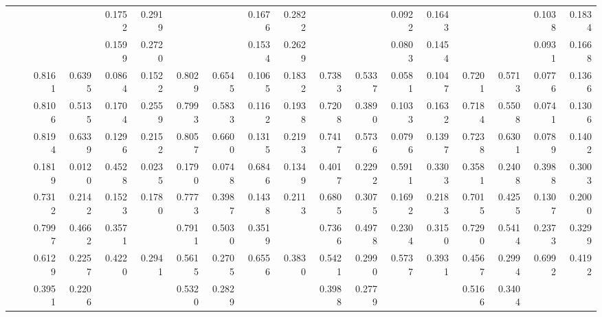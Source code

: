 {\begin{table*}[t]
{\begin{tabular}{|l|l|r|r|r|r|r|r|r|r|r|r|r|r|r|r|r|r|}
				\multirow{11}{*}{\rotatebox{90}{\DBLP}} 
				&\ATC       & \cellcolor{LightRed}{0.8376} & \cellcolor{LightCyan}{0.8749} & 0.1752 & 0.2919 & \cellcolor{LightRed}{0.8230} & \cellcolor{LightCyan}{0.8916} & 0.1676 & 0.2822 & \cellcolor{LightRed}{0.7527} & \cellcolor{LightCyan}{0.7539} & 0.0922 & 0.1643 & \cellcolor{LightRed}{0.7360} & \cellcolor{LightCyan}{0.7849} & 0.1038 & 0.1834 \\
				&\CTC       & \cellcolor{LightCyan}{0.8365} & \cellcolor{LightRed}{0.9107} & 0.1599 & 0.2720 & \cellcolor{LightCyan}{0.8216} & \cellcolor{LightRed}{0.9214} & 0.1534 & 0.2629 & \cellcolor{LightCyan}{0.7512} & \cellcolor{LightRed}{0.7711} & 0.0803 & 0.1454 & \cellcolor{LightCyan}{0.7345} & \cellcolor{LightRed}{0.8012} & 0.0931 & 0.1668 \\\cline{2-18}
				&\MAML      & 0.8161 & 0.6395 & 0.0864 & 0.1522 & 0.8029 & 0.6545 & 0.1065 & 0.1832 & 0.7383 & 0.5337 & 0.0581 & 0.1047 & 0.7201 & 0.5713 & 0.0776 & 0.1366 \\
				&\Reptile   & 0.8106 & 0.5135 & 0.1704 & 0.2559 & 0.7993 & 0.5833 & 0.1162 & 0.1938 & 0.7208 & 0.3890 & 0.1033 & 0.1632 & 0.7184 & 0.5508 & 0.0741 & 0.1306 \\
				&\Featrans  & 0.8194 & 0.6339 & 0.1296 & 0.2152 & 0.8057 & 0.6600 & 0.1315 & 0.2193 & 0.7417 & 0.5736 & 0.0796 & 0.1397 & 0.7238 & 0.6301 & 0.0789 & 0.1402 \\
				&\PN        & 0.1819 & 0.0120 & 0.4528 & 0.0235 & 0.1790 & 0.0748 & 0.6846 & 0.1349 & 0.4017 & 0.2292 & 0.5911 & 0.3303 & 0.3581 & 0.2408 & 0.3988 & 0.3003 \\\cline{2-18}
				&\Supervise & 0.7312 & 0.2142 & 0.1523 & 0.1780 & 0.7773 & 0.3987 & 0.1438 & 0.2113 & 0.6805 & 0.3075 & 0.1692 & 0.2183 & 0.7015 & 0.4255 & 0.1307 & 0.2000 \\
				&\ICSGNN    & 0.7997 & 0.4662 & 0.3571 & \cellcolor{LightRed}{0.4044} & 0.7911 & 0.5030 & 0.3519 & \cellcolor{LightCyan}{0.4141} & 0.7366 & 0.4978 & 0.2304 & 0.3150 & 0.7290 & 0.5414 & 0.2373 & 0.3299 \\
				&\AQDGNN    & 0.6129 & 0.2257 & 0.4220 & 0.2941 & 0.5615 & 0.2705 & 0.6556 & 0.3830 & 0.5421 & 0.2990 & 0.5737 & 0.3931 & 0.4567 & 0.2994 & 0.6992 & 0.4192 \\\cline{2-18}
				&\CGNPIP    & 0.3951 & 0.2206 & \cellcolor{LightRed}{0.8548} & \cellcolor{LightCyan}{0.3507} & 0.5320 & 0.2829 & \cellcolor{LightRed}{0.8175} & \cellcolor{LightRed}{0.4203} & 0.3988 & 0.2779 & \cellcolor{LightRed}{0.8288} & \cellcolor{LightRed}{0.4162} & 0.5166 & 0.3404 & \cellcolor{LightCyan}{0.7720} & \cellcolor{LightCyan}{0.4725} \\

\end{tabular}}
\end{table*}}
